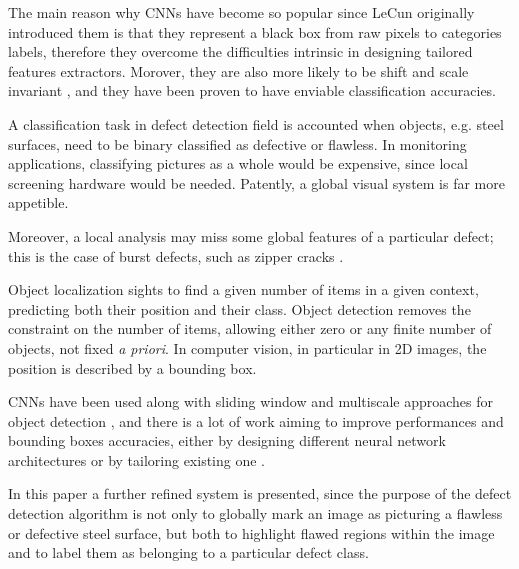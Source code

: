     \par{
        The main reason why CNNs have become so popular since LeCun originally introduced them \cite{nips:NIPS1989_293, ieee:726791, LeCun:1999:ORG:646469.691875, researchgate:deeplearning} is that they represent a black box from raw pixels to categories labels, therefore they overcome the difficulties intrinsic in designing tailored features extractors. Morover, they are also more likely to be shift and scale invariant \cite{LeCun:1999:ORG:646469.691875}, and they have been proven to have enviable classification accuracies.
    }
    \par{
        A classification task in defect detection field is accounted when objects, e.g. steel surfaces, need to be binary classified as defective or flawless. In monitoring applications, classifying pictures as a whole would be expensive, since local screening hardware would be needed. Patently, a global visual system is far more appetible. 
    }
    \par{
        Moreover, a local analysis may miss some global features of a particular defect; this is the case of burst defects, such as zipper cracks \cite{defects:mainlinemetals}.
    }
    \par{
        Object localization sights to find a given number of items in a given context, predicting both their position and their class. Object detection removes the constraint on the number of items, allowing either zero or any finite number of objects, not fixed \emph{a priori}. In computer vision, in particular in 2D images, the position is described by a bounding box.
    }
    \par{
        CNNs have been used along with sliding window and multiscale approaches for object detection \cite{ieee:7410526, ieee:7532516, arXiv:1312.6229S}, and there is a lot of work aiming to improve performances and bounding boxes accuracies, either by designing different neural network architectures \cite{ieee:7410526} or by tailoring existing one \cite{ieee:726791}.
    }
    \par{
        In this paper a further refined system is presented, since the purpose of the defect detection algorithm is not only to globally mark an image as picturing a flawless or defective steel surface, but both to highlight flawed regions within the image and to label them as belonging to a particular defect class.
    }
